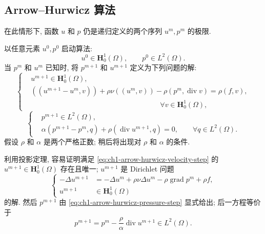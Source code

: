 \subsection{Arrow--Hurwicz 算法}
\label{subsec:ch1-arrow-hurwicz-algorithm}

在此情形下, 函数 $u$ 和 $p$ 仍是递归定义的两个序列 $u^m,p^m$ 的极限.

以任意元素 $u^0,p^0$ 启动算法:
\begin{equation}
u^0\in\mathbf H_0^1(\Omega),
\qquad p^0\in L^2(\Omega).
\label{eq:ch1-arrow-hurwicz-initial-data}
\end{equation}
当 $p^m$ 和 $u^m$ 已知时, 将 $p^{m+1}$ 和 $u^{m+1}$ 定义为下列问题的解:
\begin{equation}
\left\{
\begin{aligned}
&u^{m+1}\in\mathbf H_0^1(\Omega),\\
&((u^{m+1}-u^m,v))+\rho\nu((u^m,v))
-\rho(p^m,\operatorname{div}v)=\rho(f,v),\\
&\hspace{18em}\forall v\in\mathbf H_0^1(\Omega),
\end{aligned}
\right.
\label{eq:ch1-arrow-hurwicz-velocity-step}
\end{equation}
\begin{equation}
\left\{
\begin{aligned}
&p^{m+1}\in L^2(\Omega),\\
&\alpha(p^{m+1}-p^m,q)+\rho(\operatorname{div}u^{m+1},q)=0,
\qquad \forall q\in L^2(\Omega).
\end{aligned}
\right.
\label{eq:ch1-arrow-hurwicz-pressure-step}
\end{equation}
假设 $\rho$ 和 $\alpha$ 是两个严格正数; 稍后将出现对 $\rho$ 和 $\alpha$ 的条件.

利用投影定理, 容易证明满足 \eqref{eq:ch1-arrow-hurwicz-velocity-step} 的 $u^{m+1}\in\mathbf H_0^1(\Omega)$ 存在且唯一; $u^{m+1}$ 是 Dirichlet 问题
\begin{equation}
\left\{
\begin{aligned}
-\Delta u^{m+1}
&=-\Delta u^m+\rho\nu\Delta u^m
-\rho\operatorname{grad}p^m+\rho f,\\
u^{m+1}&\in\mathbf H_0^1(\Omega)
\end{aligned}
\right.
\label{eq:ch1-arrow-hurwicz-dirichlet-step}
\end{equation}
的解. 然后 $p^{m+1}$ 由 \eqref{eq:ch1-arrow-hurwicz-pressure-step} 显式给出; 后一方程等价于
\begin{equation}
p^{m+1}=p^m-\frac{\rho}{\alpha}\operatorname{div}u^{m+1}
\in L^2(\Omega).
\label{eq:ch1-arrow-hurwicz-pressure-update}
\end{equation}

